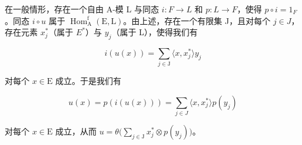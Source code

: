 在一般情形，存在一个自由 A-模 L 与同态 \(i: F \to L\) 和 \(p: L \to F\)，使得 \(p \circ i = 1_{F}\)。同态 \(i \circ u\) 属于 \(\operatorname{Hom}_{\mathrm{A}}^{\mathrm{f}}(\mathrm{E}, \mathrm{L})\)。由上述，存在一个有限集 J，且对每个 \(j \in J\)，存在元素 \(x_{j}^{*}\)（属于 \(E^{*}\)）与 \(y_{j}\)（属于 L），使得我们有

\[
i (u (x)) = \sum_ {j \in \mathrm{J}} \langle x, x _ {j} ^ {*} \rangle y _ {j}
\]

对每个 \(x \in \mathrm{E}\) 成立。于是我们有

\[
u (x) = p \left(i (u (x))\right) = \sum_ {j \in J} \langle x, x _ {j} ^ {*} \rangle p \left(y _ {j}\right)
\]

对每个 \(x \in \mathrm{E}\) 成立，从而 \(u = \theta\big(\sum_{j \in \mathrm{J}} x_j^* \otimes p(y_j)\big)\)。

